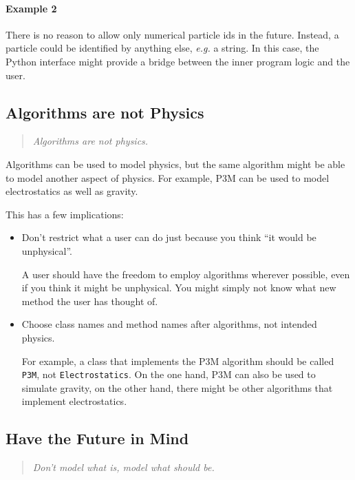 \documentclass[
a4paper,                        %
11pt,                           %
]{scrartcl}
\newcommand{\eg}{\textit{e.g.}\xspace}
\newenvironment{designrule}{\begin{quote}\itshape}{\end{quote}}
\begin{document}
\paragraph{Example 2}
There is no reason to allow only numerical particle ids in the
future. Instead, a particle could be identified by anything else, \eg
a string. In this case, the Python interface might provide a bridge
between the inner program logic and the user.

\subsection{Algorithms are not Physics}

\begin{designrule}
  Algorithms are not physics.
\end{designrule}

Algorithms can be used to model physics, but the same algorithm might
be able to model another aspect of physics. For example, P3M can be
used to model electrostatics as well as gravity.

This has a few implications:

\begin{itemize}
\item Don't restrict what a user can do just because you think ``it
  would be unphysical''.

  A user should have the freedom to employ algorithms wherever
  possible, even if you think it might be unphysical. You might simply
  not know what new method the user has thought of.

\item Choose class names and method names after algorithms, not intended
  physics.

  For example, a class that implements the P3M algorithm should be
  called \texttt{P3M}, not \texttt{Electrostatics}. On the one hand,
  P3M can also be used to simulate gravity, on the other hand, there
  might be other algorithms that implement electrostatics.
\end{itemize}

\subsection{Have the Future in Mind}

\begin{designrule}
  Don't model what is, model what should be.
\end{designrule}
\end{document}
